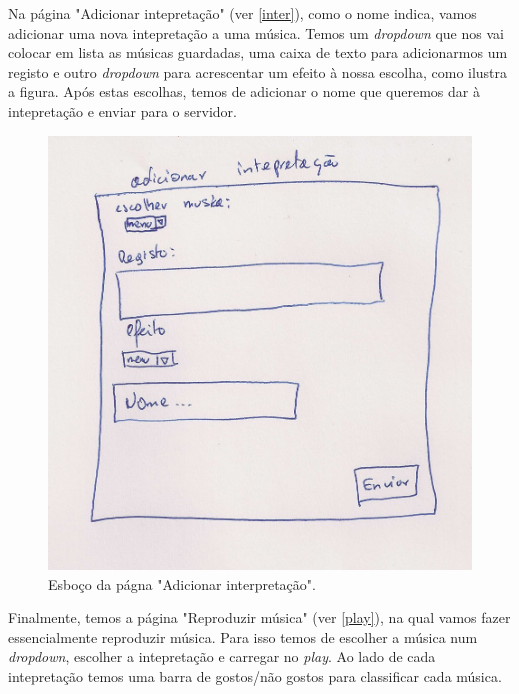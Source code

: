 \documentclass{report}
\begin{document}
Na página "Adicionar intepretação" (ver \autoref{inter}), como o nome indica, vamos adicionar uma nova intepretação a uma música. Temos um \textit{dropdown} que nos vai colocar em lista as músicas guardadas, uma caixa de texto para adicionarmos um registo e outro \textit{dropdown} para acrescentar um efeito à nossa escolha, como ilustra a figura. Após estas escolhas, temos de adicionar o nome que queremos dar à intepretação e enviar para o servidor.

\begin{figure}[htp]
\centering
\includegraphics[width=\textwidth]{images/adicionarinterpretacao.jpg}
\caption{Esboço da págna "Adicionar interpretação".}
\label{inter}
\end{figure}

Finalmente, temos a página "Reproduzir música" (ver \autoref{play}), na qual vamos fazer essencialmente reproduzir música. Para isso temos de escolher a música num \textit{dropdown}, escolher a intepretação e carregar no \textit{play}. Ao lado de cada intepretação temos uma barra de gostos/não gostos para classificar cada música.
\end{document}
